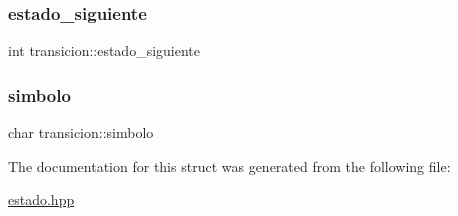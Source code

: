 \subsubsection{\texorpdfstring{estado\+\_\+siguiente}{estado\_siguiente}}
{\footnotesize\ttfamily int transicion\+::estado\+\_\+siguiente}

\mbox{\label{structtransicion_a27058a2ed163e3340cca81a991a03166}} 
\subsubsection{\texorpdfstring{simbolo}{simbolo}}
{\footnotesize\ttfamily char transicion\+::simbolo}



The documentation for this struct was generated from the following file\+:\begin{DoxyCompactItemize}
\item 
\hyperlink{estado_8hpp}{estado.\+hpp}\end{DoxyCompactItemize}
